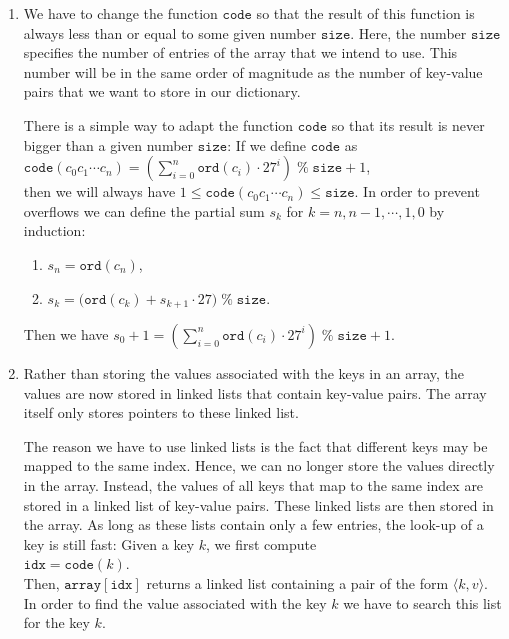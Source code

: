 \begin{enumerate}
\item We have to change the function  $\mathtt{code}$ so that the result of this function is always
      less than or equal to some given number $\mathtt{size}$.  Here, the number $\mathtt{size}$ specifies
      the number of entries of the array that we intend to use.  This number will be in the same
      order of magnitude as the number of key-value pairs that we want to store in our dictionary.

      There is a simple way to adapt the function  $\mathtt{code}$ so that its result is never bigger
      than a given number $\mathtt{size}$: If we define $\mathtt{code}$ as
      \\[0.2cm]
      \hspace*{1.3cm} 
      $\mathtt{code}(c_0c_1\cdots c_n) = \left(\sum\limits_{i=0}^n \mathtt{ord}(c_i) \cdot
        27^i\right) \;\texttt{\%}\; \mathtt{size} + 1$,
      \\[0.2cm]
      then we will always have $1 \leq \mathtt{code}(c_0c_1\cdots c_n) \leq \mathtt{size}$.  In order to
      prevent overflows we can define the partial sum $s_k$ for  $k=n,n-1,\cdots,1,0$ by induction:
      \begin{enumerate}
      \item $s_n = \mathtt{ord}(c_n)$,
      \item $s_{k} = \bigl(\mathtt{ord}(c_{k}) + s_{k+1} \cdot 27 \bigr) \;\texttt{\%}\; \mathtt{size}$.
      \end{enumerate}
      Then we have
      \hspace*{1.3cm} 
      $s_0 + 1 = \left(\sum\limits_{i=0}^n \mathtt{ord}(c_i) \cdot 27^i\right) \;\texttt{\%}\; \mathtt{size} + 1$.
\item Rather than storing the values associated with the keys in an array, the values are now stored
      in linked lists that contain key-value pairs.  The array itself only stores pointers to these linked list.
      
      The reason we have to use linked lists is the fact that different keys may be mapped to the
      same index.  Hence, we can no longer store the values directly in the array.  Instead,
      the values of all keys that map to the same index are stored in a
      linked list of key-value pairs.  These linked lists are then stored in the array.  As long as
      these lists contain only a few entries, the look-up of a key is still fast: Given a key $k$,
      we first compute 
      \\[0.2cm]
      \hspace*{1.3cm}
      $\mathtt{idx} = \mathtt{code}(k)$.
      \\[0.2cm]
      Then, $\mathtt{array}[\mathtt{idx}]$ returns a linked list containing a pair of the form $\langle k, v \rangle$.
      In order to find the value associated with the key $k$ we have to search this list for the key
      $k$.
\end{enumerate}
